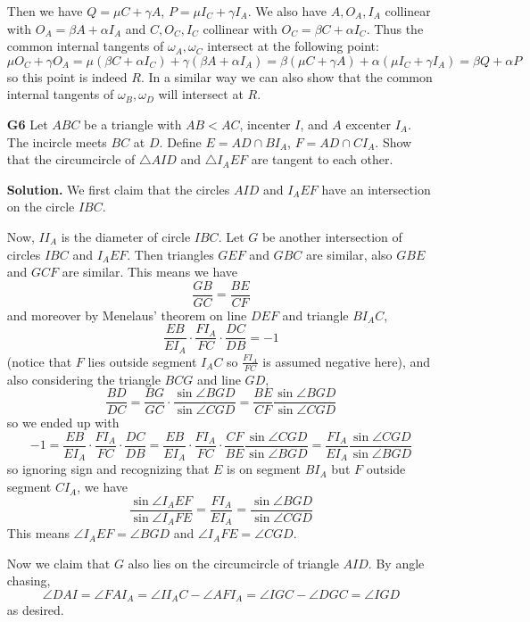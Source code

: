 \documentclass[11pt,a4paper]{article}
\begin{document}
\begin{enumerate}
	Then we have $Q = \mu C + \gamma A$, 
	$P = \mu I_C + \gamma I_A$. 
	We also have $A, O_A, I_A$ collinear with $O_A = \beta A + \alpha I_A$ and 
	$C, O_C, I_C$ collinear with $O_C = \beta C + \alpha I_C$. 
	Thus the common internal tangents of $\omega_A, \omega_C$ intersect at the following point: 
	\[
	\mu O_C + \gamma O_A
	=\mu (\beta C + \alpha I_C) + \gamma (\beta A + \alpha I_A)
	=\beta(\mu C + \gamma A) + \alpha(\mu I_C + \gamma I_A)
	=\beta Q + \alpha P
	\]
	so this point is indeed $R$. 
	In a similar way we can also show that the common internal tangents of $\omega_B, \omega_D$ will intersect at $R$. 
	
	\item [\textbf{G6}] Let $ABC$ be a triangle with $AB < AC$, incenter $I$, and $A$ excenter $I_{A}$. The incircle meets $BC$ at $D$. Define $E = AD\cap BI_{A}$, $F = AD\cap CI_{A}$. Show that the circumcircle of $\triangle AID$ and $\triangle I_{A}EF$ are tangent to each other. 
	
	\textbf{Solution.} We first claim that the circles $AID$ and $I_AEF$ have an intersection on the circle $IBC$. 
	
	Now, $II_A$ is the diameter of circle $IBC$. Let $G$ be another intersection of circles $IBC$ and $I_AEF$. 
	Then triangles $GEF$ and $GBC$ are similar, also $GBE$ and $GCF$ are similar. 
	This means we have 
	\[
	\frac{GB}{GC}=\frac{BE}{CF}
	\]
	and moreover by Menelaus' theorem on line $DEF$ and triangle $BI_AC$, 
	\[
	\frac{EB}{EI_A}\cdot \frac{FI_A}{FC}\cdot \frac{DC}{DB}=-1
	\]
	(notice that $F$ lies outside segment $I_AC$ so $\frac{FI_A}{FC}$ is assumed negative here), 
	and also considering the triangle $BCG$ and line $GD$, 
	\[
	\frac{BD}{DC} = \frac{BG}{GC}\cdot \frac{\sin\angle BGD}{\sin\angle CGD}
	=\frac{BE}{CF}\frac{\sin\angle BGD}{\sin\angle CGD}
	\]
	so we ended up with 
	\[
	-1=\frac{EB}{EI_A}\cdot \frac{FI_A}{FC}\cdot \frac{DC}{DB}
	=\frac{EB}{EI_A}\cdot \frac{FI_A}{FC}\cdot \frac{CF}{BE}\frac{\sin\angle CGD}{\sin\angle BGD}
	=\frac{FI_A}{EI_A}\frac{\sin\angle CGD}{\sin\angle BGD}
	\]
	so ignoring sign and recognizing that $E$ is on segment $BI_A$ but $F$ outside segment $CI_A$, we have 
	\[
	\frac{\sin\angle I_AEF}{\sin\angle I_AFE}=\frac{FI_A}{EI_A} = \frac{\sin\angle BGD}{\sin\angle CGD}
	\]
	This means $\angle I_AEF = \angle BGD$ and $\angle I_AFE=\angle CGD$. 
	
	Now we claim that $G$ also lies on the circumcircle of triangle $AID$. By angle chasing, 
	\[
	\angle DAI
	=\angle FAI_A 
	=\angle II_AC - \angle AFI_A
	=\angle IGC - \angle DGC
	=\angle IGD
	\]
	as desired. 
	

\end{enumerate}
\end{document}
